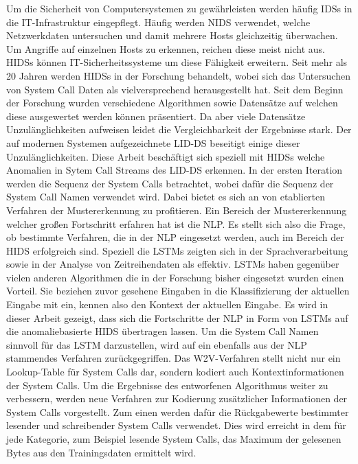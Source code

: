 Um die Sicherheit von Computersystemen zu gewährleisten werden häufig \acp{IDS} in die IT-Infrastruktur eingepflegt.
Häufig werden \ac{NIDS} verwendet, welche Netzwerkdaten untersuchen und damit mehrere Hosts gleichzeitig überwachen.
Um Angriffe auf einzelnen Hosts zu erkennen, reichen diese meist nicht aus.
\acp{HIDS} können IT-Sicherheitssysteme um diese Fähigkeit erweitern.
Seit mehr als 20 Jahren werden \acp{HIDS} in der Forschung behandelt, wobei sich das Untersuchen von System Call Daten als vielversprechend herausgestellt hat.
Seit dem Beginn der Forschung wurden verschiedene Algorithmen sowie Datensätze auf welchen diese ausgewertet werden können präsentiert.
Da aber viele Datensätze Unzulänglichkeiten aufweisen leidet die Vergleichbarkeit der Ergebnisse stark.
Der auf modernen Systemen aufgezeichnete \ac{LID-DS} beseitigt einige dieser Unzulänglichkeiten.
Diese Arbeit beschäftigt sich speziell mit \acp{HIDS} welche Anomalien in Sytem Call Streams des \ac{LID-DS} erkennen. 
In der  ersten Iteration werden die Sequenz der System Calls betrachtet, wobei dafür die Sequenz der System Call Namen verwendet wird.
Dabei bietet es sich an von etablierten Verfahren der Mustererkennung zu profitieren.
Ein Bereich der Mustererkennung welcher großen Fortschritt erfahren hat ist die \ac{NLP}.
Es stellt sich also die Frage, ob bestimmte Verfahren, die in der \ac{NLP} eingesetzt werden, auch im Bereich der \ac{HIDS} erfolgreich sind.
Speziell die \acp{LSTM} zeigten sich in der Sprachverarbeitung sowie in der Analyse von Zeitreihendaten als effektiv.
\acp{LSTM} haben gegenüber vielen anderen Algorithmen die in der Forschung bisher eingesetzt wurden einen Vorteil.
Sie beziehen zuvor gesehene Eingaben in die Klassifizierung der aktuellen Eingabe mit ein, kennen also den Kontext der aktuellen Eingabe.
Es wird in dieser Arbeit gezeigt, dass sich die Fortschritte der \ac{NLP} in Form von \acp{LSTM} auf die anomaliebasierte \ac{HIDS} übertragen lassen.
Um die System Call Namen sinnvoll für das \ac{LSTM} darzustellen, wird auf ein ebenfalls aus der \ac{NLP} stammendes Verfahren zurückgegriffen.
Das \ac{W2V}-Verfahren stellt nicht nur ein Lookup-Table für System Calls dar, sondern kodiert auch Kontextinformationen der System Calls.
Um die Ergebnisse des entworfenen Algorithmus weiter zu verbessern, werden neue Verfahren zur Kodierung zusätzlicher Informationen der System Calls vorgestellt.
Zum einen werden dafür die Rückgabewerte bestimmter lesender und schreibender System Calls verwendet. 
Dies wird erreicht in dem für jede Kategorie, zum Beispiel lesende System Calls, das Maximum der gelesenen Bytes aus den Trainingsdaten ermittelt wird.
